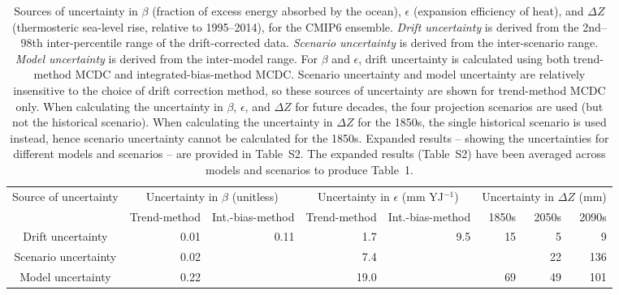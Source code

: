 \begin{table*}[t]
\centering
\caption{Sources of uncertainty in $\beta$ (fraction of excess energy absorbed by the ocean), $\epsilon$ (expansion efficiency of heat), and ${\Delta}Z$ (thermosteric sea-level rise, relative to 1995--2014), for the CMIP6 ensemble. \emph{Drift uncertainty} is derived from the 2nd--98th inter-percentile range of the drift-corrected data. \emph{Scenario uncertainty} is derived from the inter-scenario range. \emph{Model uncertainty} is derived from the inter-model range. For $\beta$ and $\epsilon$, drift uncertainty is calculated using both trend-method MCDC and integrated-bias-method MCDC. Scenario uncertainty and model uncertainty are relatively insensitive to the choice of drift correction method, so these sources of uncertainty are shown for trend-method MCDC only. When calculating the uncertainty in $\beta$, $\epsilon$, and ${\Delta}Z$ for future decades, the four projection scenarios are used (but not the historical scenario). When calculating the uncertainty in ${\Delta}Z$ for the 1850s, the single historical scenario is used instead, hence scenario uncertainty cannot be calculated for the 1850s. Expanded results -- showing the uncertainties for different models and scenarios -- are provided in Table~S2. The expanded results (Table~S2) have been averaged across models and scenarios to produce Table~1.}
\begin{tabular}{c|rr|rr|rrr}
\toprule
Source of uncertainty & \multicolumn{2}{c|}{Uncertainty in $\beta$ (unitless)} & \multicolumn{2}{c|}{Uncertainty in $\epsilon$ (mm YJ$^{-1}$)} & \multicolumn{3}{c}{Uncertainty in ${\Delta}Z$ (mm)} \\
 & Trend-method & Int.-bias-method & Trend-method & Int.-bias-method & 1850s & 2050s & 2090s \\
\midrule
Drift uncertainty & 0.01 & 0.11 & 1.7 & 9.5 & 15 & 5 & 9 \\
Scenario uncertainty & 0.02 &  & 7.4 &  &  & 22 & 136 \\
Model uncertainty & 0.22 &  & 19.0 &  & 69 & 49 & 101 \\
\bottomrule
\end{tabular}
\end{table*}
